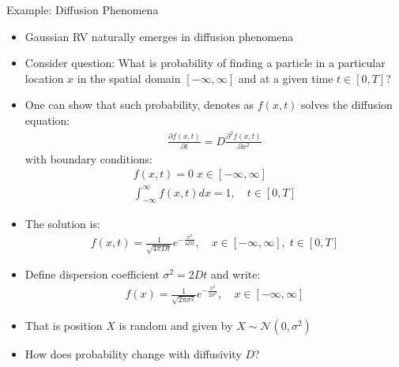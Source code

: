 \documentclass[9pt]{beamer}
\begin{document}
%
\begin{frame}{Example: Diffusion Phenomena}
\begin{itemize}
\item Gaussian RV naturally emerges in diffusion phenomena
\item Consider question: What is probability of finding a particle in a particular location $x$ in the spatial domain $ [-\infty,\infty]$ and at a given time $t\in [0,T]$?
\item One can show that such probability, denotes as $f(x,t)$ solves the diffusion equation:
\begin{align*}
\frac{\partial f(x,t)}{\partial t}=D\frac{\partial^2 f(x,t)}{\partial x^2}
\end{align*}
with boundary conditions:
\begin{align*}
f(x,t)=0\; x\in [-\infty,\infty]\\
\int_{-\infty}^{\infty}f(x,t)dx=1,\quad t\in [0,T]
\end{align*}
\item The solution is:
\begin{align*}
f(x,t)=\frac{1}{\sqrt{4 \pi D t}}e^{-\frac{x^2}{4Dt}},\quad x\in [-\infty,\infty],\; t\in [0,T]
\end{align*}
\item Define dispersion coefficient $\sigma^2=2Dt$ and write:
\begin{align*}
f(x)=\frac{1}{\sqrt{2 \pi \sigma^2}}e^{-\frac{x^2}{2\sigma^2}},\quad  x\in [-\infty,\infty]
\end{align*}
\item That is position $X$ is random and given by $X\sim\mathcal{N}(0,\sigma^2)$ 
\item How does probability change with diffusivity $D$?
\end{itemize}

\end{frame}
\end{document}
